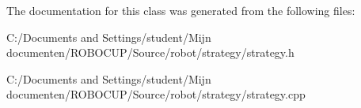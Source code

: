 The documentation for this class was generated from the following files\-:\begin{DoxyCompactItemize}
\item 
C\-:/\-Documents and Settings/student/\-Mijn documenten/\-R\-O\-B\-O\-C\-U\-P/\-Source/robot/strategy/strategy.\-h\item 
C\-:/\-Documents and Settings/student/\-Mijn documenten/\-R\-O\-B\-O\-C\-U\-P/\-Source/robot/strategy/strategy.\-cpp\end{DoxyCompactItemize}
